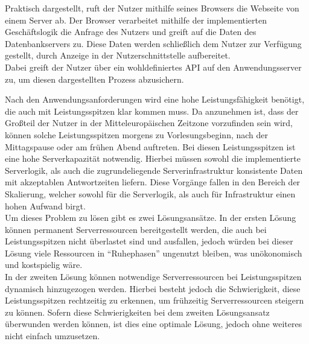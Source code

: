 Praktisch dargestellt, ruft der Nutzer mithilfe seines Browsers die Webseite von einem Server ab.
Der Browser verarbeitet mithilfe der implementierten Geschäftslogik die Anfrage des Nutzers und greift auf die Daten des Datenbankservers zu. Diese Daten werden schließlich dem Nutzer zur Verfügung gestellt, durch Anzeige in der Nutzerschnittstelle aufbereitet.\\
Dabei greift der Nutzer über ein wohldefiniertes \ac{API} auf den Anwendungsserver zu, um diesen dargestellten Prozess abzusichern.


Nach den Anwendungsanforderungen wird eine hohe Leistungsfähigkeit benötigt, die auch mit Leistungsspitzen klar kommen muss. Da anzunehmen ist, dass der Großteil der Nutzer in der Mitteleuropäischen Zeitzone vorzufinden sein wird, können solche Leistungsspitzen morgens zu Vorlesungsbeginn, nach der Mittagspause oder am frühen Abend auftreten. Bei diesen Leistungsspitzen ist eine hohe Serverkapazität notwendig.
Hierbei müssen sowohl die implementierte Serverlogik, als auch die zugrundeliegende Serverinfrastruktur konsistente Daten mit akzeptablen Antwortzeiten liefern. Diese Vorgänge fallen in den Bereich der Skalierung, welcher sowohl für die Serverlogik, als auch für Infrastruktur einen hohen Aufwand birgt.\\
Um dieses Problem zu lösen gibt es zwei Lösungsansätze. In der ersten Lösung können permanent Serverressourcen bereitgestellt werden, die auch bei Leistungsspitzen nicht überlastet sind und ausfallen, jedoch würden bei dieser Lösung viele Ressourcen in \enquote{Ruhephasen} ungenutzt bleiben, was unökonomisch und kostspielig wäre.\\
In der zweiten Lösung können notwendige Serverressourcen bei Leistungsspitzen dynamisch hinzugezogen werden. Hierbei besteht jedoch die Schwierigkeit, diese Leistungsspitzen rechtzeitig zu erkennen, um frühzeitig Serverressourcen steigern zu können. Sofern diese Schwierigkeiten bei dem zweiten Lösungsansatz überwunden werden können, ist dies eine optimale Lösung, jedoch ohne weiteres nicht einfach umzusetzen.\\






